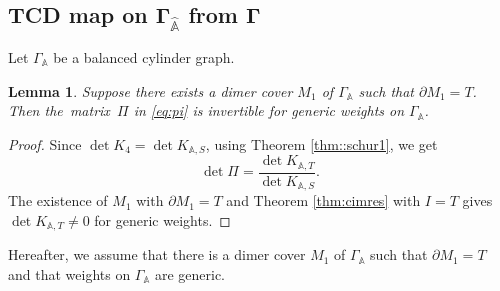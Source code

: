 \documentclass[pdftex]{sigma}
\numberwithin{equation}{section}
\newtheorem{Lemma}[Theorem]{Lemma}
\newcommand{\A}{{\mathbb A}}
\newcommand{\la}{\label}
\begin{document}
	
	\subsection[TCD map on Gamma\_\{widehat A\} from Gamma]{TCD map on $\boldsymbol{\Gamma_{\widehat \A}}$ from $\boldsymbol{\Gamma}$}
	\la{subsec:tcd}
	
	Let $\Gamma_\A$ be a balanced cylinder graph.
	
	\begin{Lemma} \la{lem:m1}
		Suppose there exists a dimer cover $M_1$ {of $\Gamma_\A$} such that $\partial M_1=T$. Then the~matrix~$\Pi$ in \eqref{eq:pi} is invertible for generic weights on $\Gamma_\A$.
	\end{Lemma}
	\begin{proof}
		Since $\det K_4=\det K_{\A,S}$, using Theorem \ref{thm::schur1}, we get
		\[
		\det \Pi=\frac{\det K_{\A,T}}{\det K_{\A,S}}.
		\]
		The existence of $M_1$ with $\partial M_1=T$ and Theorem \ref{thm:cimres} with $I=T$ gives $\det K_{\A,T} \neq 0$ for generic weights.
	\end{proof}
	
	
	Hereafter, we assume that there is a dimer cover $M_1$ of $\Gamma_\A$ such that $\partial M_1=T$ and that weights on $\Gamma_\A$ are generic.
	
\end{document}
